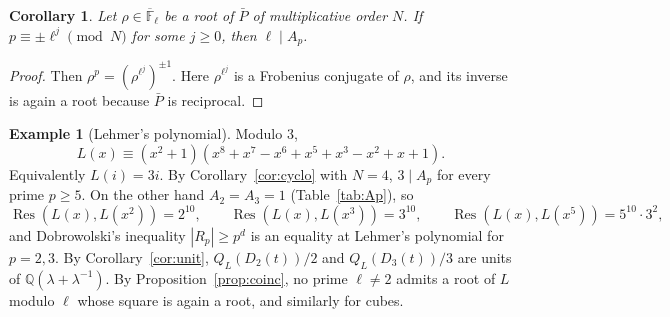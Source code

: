 \documentclass[11pt]{amsart}
\newtheorem{corollary}[theorem]{Corollary}
\theoremstyle{definition}
\newtheorem{example}[theorem]{Example}
\theoremstyle{remark}
\DeclareMathOperator{\Res}{Res}
\newcommand{\Q}{\mathbb Q}
\newcommand{\F}{\mathbb F}
\begin{document}
\begin{corollary}\label{cor:frob}
Let $\rho\in\overline{\F}_\ell$ be a root of $\bar P$ of multiplicative order $N$. If $p\equiv\pm\ell^j\pmod N$ for some $j\ge0$, then $\ell\mid A_p$.
\end{corollary}
\begin{proof}
Then $\rho^p=(\rho^{\ell^j})^{\pm1}$. Here $\rho^{\ell^j}$ is a Frobenius conjugate of $\rho$, and its inverse is again a root because $\bar P$ is reciprocal.
\end{proof}

\begin{example}[Lehmer's polynomial]\label{ex:lehmer}
Modulo $3$,
\[
L(x)\equiv(x^2+1)(x^8+x^7-x^6+x^5+x^3-x^2+x+1).
\]
Equivalently $L(i)=3i$. By Corollary~\ref{cor:cyclo} with $N=4$, $3\mid A_p$ for every prime $p\ge5$. On the other hand $A_2=A_3=1$ (Table~\ref{tab:Ap}), so
\[
\Res(L(x),L(x^2))=2^{10},\qquad \Res(L(x),L(x^3))=3^{10},\qquad \Res(L(x),L(x^5))=5^{10}\cdot 3^2,
\]
and Dobrowolski's inequality $|R_p|\ge p^{d}$ is an equality at Lehmer's polynomial for $p=2,3$. By Corollary~\ref{cor:unit}, $Q_L(D_2(t))/2$ and $Q_L(D_3(t))/3$ are units of $\Q(\lambda+\lambda^{-1})$. By Proposition~\ref{prop:coinc}, no prime $\ell\neq2$ admits a root of $L$ modulo $\ell$ whose square is again a root, and similarly for cubes.
\end{example}
\end{document}
